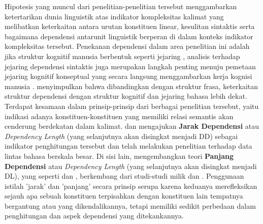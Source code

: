 Hipotesis yang muncul dari penelitian-penelitian tersebut menggambarkan ketertarikan dunia linguistik atas indikator kompleksitas kalimat yang melibatkan keterkaitan antara urutan konstituen linear, kesulitan sintaktis serta bagaimana dependensi antarunit linguistik berperan di dalam konteks indikator kompleksitas tersebut. Penekanan dependensi dalam area penelitian ini adalah jika struktur kognitif manusia berbentuk seperti jejaring \citep{hudson2007language}, analisis terhadap jejaring dependensi sintaktis juga merupakan langkah penting menuju pemetaan jejaring kognitif konseptual yang secara langsung menggambarkan kerja kognisi manusia \citep{liu2008dependency}. \cite{liu2008dependency} menyimpulkan bahwa dibandingkan dengan struktur frasa, keterkaitan struktur dependensi dengan struktur kognitif dan jejaring bahasa lebih dekat. Terdapat kesamaan dalam prinsip-prinsip dari berbagai penelitian tersebut, yaitu indikasi adanya konstituen-konstituen yang memiliki relasi semantis akan cenderung berdekatan dalam kalimat. \cite{liu2008dependency} dan \cite{liu2017dependency} mengajukan \textbf{Jarak Dependensi} atau \textit{Dependency Length} (yang selanjutnya akan disingkat menjadi DD) sebagai indikator penghitungan tersebut dan telah melakukan penelitian terhadap data lintas bahasa berskala besar. Di sisi lain, \cite{gildea2010grammars} mengembangkan teori \textbf{Panjang Dependensi} atau \textit{Dependency Length} (yang selanjutnya akan disingkat menjadi DL), yang seperti \cite{liu2008dependency} dan \cite{liu2017dependency}, berkembang dari studi-studi milik \citealp{gibson1998linguistic, gibson2000dependency} dan \cite{hawkins1994performance}. Penggunaan istilah 'jarak' dan 'panjang' secara prinsip serupa karena keduanya merefleksikan sejauh apa sebuah konstituen terpisahkan dengan konstituen lain tempatnya bergantung atau yang dikendalikannya, tetapi memiliki sedikit perbedaan dalam penghitungan dan aspek dependensi yang ditekankannya. 

